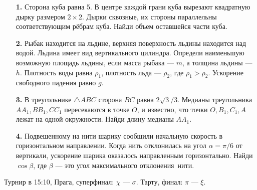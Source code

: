 \documentclass[12pt]{article}
\begin{document}
\begin{enumerate}
\item[\bf 1.] Сторона куба равна 5. В центре каждой грани куба вырезают квадратную дырку размером $2 \times 2$. 
 Дырки сквозные, их стороны параллельны соответствующим рёбрам куба. Найди объем оставшейся части куба.
  
\item[\bf 2.] Рыбак находится на льдине, верхняя поверхность льдины находится над водой. 
Льдина имеет вид вертикального цилиндра. Определи наименьшую возможную площадь льдины, если масса рыбака — $m$,  
а толщина льдины — $h$. Плотность воды равна $\rho_1$, плотность льда — $\rho_2$, где $\rho_1 > \rho_2$. 
Ускорение свободного падения равно $g$.
 
\item[\bf 3.] В треугольнике $\bigtriangleup ABC$ сторона $BC$ равна $2 \sqrt{3} / 3.$ 
Медианы треугольника $A A_1$,\,$B B_1$,\,$C C_1$ пересекаются в точке $O$, и известно, что точки $O$,\,$B_1$,\,$C_1$,\,$A$ лежат на одной окружности. 
Найди длину медианы $A A_1$.

\item[\bf 4.] Подвешенному на нити шарику сообщили начальную скорость в горизонтальном направлении. 
Когда нить отклонилась на угол $\alpha = \pi/6$ от вертикали, ускорение шарика оказалось направленным горизонтально. 
Найди $\cos\beta$, где $\beta$ — это угол максимального отклонения~нити.

\end{enumerate}

\newpage


Турнир в 15:10, Прага, суперфинал: $\chi$ — $\sigma$. Тарту, финал: $\pi$ — $\xi$.
\end{document}
